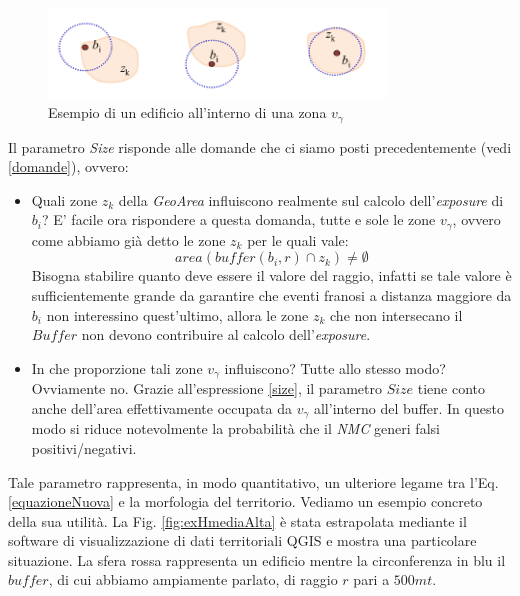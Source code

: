 \begin{figure}[bth]
  \label{fig:exBuffer}
   \centering
    \includegraphics[width=0.8\textwidth]{img/exBuffer}
     \caption{Esempio di un edificio all'interno di una zona $v_\gamma$}
      
\end{figure}
Il parametro \textit{Size} risponde alle domande che ci siamo posti precedentemente (vedi \ref{domande}), ovvero:
\begin{itemize}
\item Quali zone $z_k$ della \textit{GeoArea} influiscono realmente sul calcolo dell'\textit{exposure} di $b_i$? E' facile ora rispondere a questa domanda, tutte e sole le zone $v_\gamma$, ovvero come abbiamo già detto le zone $z_k$ per le quali vale:
\begin{equation}
\label{sizeNotZero}
   area (buffer (b_i,r) \cap z_k) \neq \emptyset
\end{equation}
Bisogna stabilire quanto deve essere il valore del raggio, infatti se tale valore è sufficientemente grande da garantire che eventi franosi a distanza maggiore da $b_i$ non interessino quest'ultimo, allora le zone $z_k$ che non intersecano il $Buffer$ non devono contribuire al calcolo dell'\textit{exposure}. \newline


\item In che proporzione tali zone $v_\gamma$ influiscono? Tutte allo stesso modo? Ovviamente no. Grazie all'espressione \ref{size}, il parametro $Size$ tiene conto anche dell'area effettivamente occupata da $v_\gamma$ all'interno del buffer. In questo modo si riduce notevolmente la probabilità che il \textit{NMC} generi falsi positivi/negativi. \newline 



\end{itemize}


Tale parametro rappresenta, in modo quantitativo, un ulteriore legame tra l'Eq.\ref{equazioneNuova} e la morfologia del territorio. Vediamo un esempio concreto della sua utilità. \newline
La Fig. \ref{fig:exHmediaAlta} è stata estrapolata mediante il software di visualizzazione di dati territoriali QGIS e mostra una particolare situazione.\newline
La sfera rossa rappresenta un edificio mentre la circonferenza in blu il $buffer$, di cui abbiamo ampiamente parlato, di raggio $r$ pari a $500mt$.

